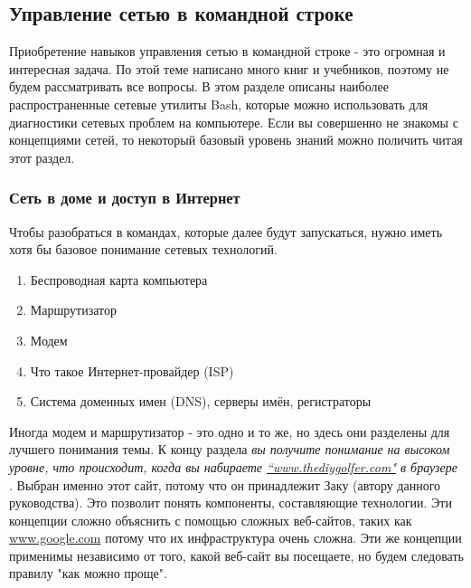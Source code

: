 \documentclass{article}
\begin{document}
\hypertarget{Networking-on-Command-Line}{%
\subsection{\texorpdfstring{\protect\hyperlink{Networking-on-Command-Line}{}Управление
сетью в командной
строке}{Управление сетью в командной строке}}\label{Networking-on-Command-Line}}

Приобретение навыков управления сетью в командной строке - это огромная
и интересная задача. По этой теме написано много книг и учебников,
поэтому не будем рассматривать все вопросы. В этом разделе описаны
наиболее распространенные сетевые утилиты Bash, которые можно
использовать для диагностики сетевых проблем на компьютере. Если вы
совершенно не знакомы с концепциями сетей, то некоторый базовый уровень
знаний можно поличить читая этот раздел.

\hypertarget{Your-home-network-and-the-internet}{%
\subsubsection{\texorpdfstring{\protect\hyperlink{Your-home-network-and-the-internet}{}Сеть
в доме и доступ в
Интернет}{Сеть в доме и доступ в Интернет}}\label{Your-home-network-and-the-internet}}

Чтобы разобраться в командах, которые далее будут запускаться, нужно
иметь хотя бы базовое понимание сетевых технологий.

\begin{enumerate}
\tightlist
\item
  Беспроводная карта компьютера
\item
  Маршрутизатор
\item
  Модем
\item
  Что такое Интернет-провайдер (ISP)
\item
  Система доменных имен (DNS), серверы имён, регистраторы
\end{enumerate}

Иногда модем и маршрутизатор - это одно и то же, но здесь они разделены
для лучшего понимания темы. К концу раздела \emph{вы получите понимание
на высоком уровне, что происходит, когда вы набираете
\href{http://www.thediygolfer.com}{``www.thediygolfer.com"} в браузере}
. Выбран именно этот сайт, потому что он принадлежит Заку (автору
данного руководства). Это позволит понять компоненты, составляющие
технологии. Эти концепции сложно объяснить с помощью сложных веб-сайтов,
таких как \href{http://www.google.com}{www.google.com} потому что их
инфраструктура очень сложна. Эти же концепции применимы независимо от
того, какой веб-сайт вы посещаете, но будем следовать правилу "как можно
проще".
\end{document}
